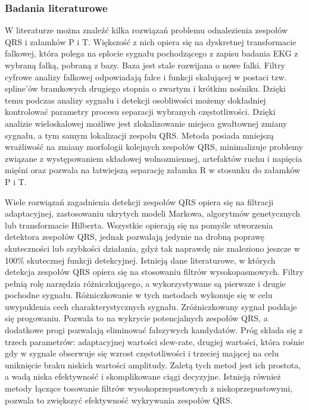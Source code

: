\documentclass[a4paper, 11pt]{article}
\begin{document}
\subsubsection{Badania literaturowe}
\label{sec:waves:papers}
W literaturze można znaleźć kilka rozwiązań problemu odnalezienia zespołów QRS i załamków P i T. Większość z nich opiera się na dyskretnej transformacie falkowej, która polega na splocie
sygnału pochodzącego z zapisu badania EKG z wybraną falką, pobraną z bazy. Baza jest stale rozwijana o nowe falki. Filtry cyfrowe analizy falkowej odpowiadają falce i funkcji skalującej w postaci tzw.
spline’ów bramkowych drugiego stopnia o zwartym i krótkim nośniku. Dzięki temu
podczas analizy sygnału i detekcji osobliwości możemy dokładniej kontrolować parametry
procesu separacji wybranych częstotliwości. Dzięki analizie wieloskalowej możliwe jest
zlokalizowanie miejsca gwałtownej zmiany sygnału, a tym samym lokalizacji zespołu QRS.
Metoda posiada mniejszą wrażliwość na zmiany morfologii kolejnych zespołów QRS,
minimalizuje problemy związane z występowaniem składowej wolnozmiennej, artefaktów
ruchu i napięcia mięśni oraz pozwala na łatwiejszą separację załamka R w stosunku do
załamków P i T.

Wiele rozwiązań zagadnienia detekcji zespołów QRS opiera się na filtracji adaptacyjnej,
zastosowaniu ukrytych modeli Markowa, algorytmów genetycznych lub
transformacie Hilberta. Wszystkie opierają się na pomyśle utworzenia detektora zespołów QRS, jednak pozwalają jedynie na drobną poprawę
skuteczności lub szybkości działania, gdyż tak naprawdę nie znaleziono jeszcze w 100\% skutecznej funkcji detekcyjnej. 
Istnieją dane literaturowe, w których detekcja zespołów QRS opiera się na stosowaniu filtrów wysokopasmowych. Filtry pełnią rolę narzędzia różniczkującego, a wykorzystywane są pierwsze i drugie pochodne sygnału. Różniczkowanie w tych metodach wykonuje się w celu uwypuklenia cech charakterystycznych sygnału. Zróżniczkowany sygnał poddaje się progowaniu. Pozwala to na wykrycie potencjalnych zespołów QRS, a dodatkowe progi pozwalają eliminować fałszywych kandydatów. Próg składa się z trzech parametrów: adaptacyjnej wartości slew-rate, drugiej wartości, która rośnie gdy w sygnale obserwuje się wzrost częstotliwości i trzeciej mającej na celu uniknięcie braku niskich wartości amplitudy. Zaletą tych metod jest ich prostota, a wadą niska efektywność i skomplikowane ciągi decyzyjne. Istnieją również metody łączące tosowanie filtrów wysokoprzepustowych z niskoprzepustowymi, pozwala to zwiększyć efektywność wykrywania zespołów QRS.
\end{document}
